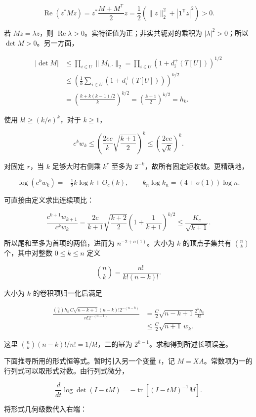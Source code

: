 \documentclass[11pt,a4paper]{article}
\begin{document}
\[\operatorname{Re}(z^*Mz)=z^*\frac{M+M^{\mathsf T}}2z
=\frac12(\|z\|_2^2+|\mathbf1^{\mathsf T}z|^2)>0.\]

若 \(Mz=\lambda z\)，则 \(\operatorname{Re}\lambda>0\)。实特征值为正；非实共轭对的乘积为 \(|\lambda|^2>0\)；所以 \(\det M>0\)。另一方面，

\[\begin{aligned}
|\det M|&\le\prod_{i\in U}\|M_{i,\cdot}\|_2
=\prod_{i\in U}(1+d_i^+(T[U]))^{1/2}\\
&\le\left(\frac1k\sum_{i\in U}(1+d_i^+(T[U]))\right)^{k/2}\\
&=\left(\frac{k+k(k-1)/2}{k}\right)^{k/2}
=\left(\frac{k+1}{2}\right)^{k/2}=h_k.
\end{aligned}\]

使用 \(k!\ge(k/e)^k\)，对于 \(k\ge1\)，

\[c^kw_k\le\left(\frac{2ec}{k}\sqrt{\frac{k+1}{2}}\right)^k
\le\left(\frac{2ec}{\sqrt k}\right)^k.\]

对固定 \(r\)，当 \(k\) 足够大时右侧乘 \(k^r\) 至多为 \(2^{-k}\)，故所有固定矩收敛。更精确地，

\[\log(c^kw_k)=-\tfrac12k\log k+O_c(k),\qquad
k_n\log k_n=(4+o(1))\log n.\]

可直接由定义求出连续项比：

\[\frac{c^{k+1}w_{k+1}}{c^kw_k}
=\frac{2c}{k+1}\sqrt{\frac{k+2}{2}}
\left(1+\frac1{k+1}\right)^{k/2}
\le\frac{K_c}{\sqrt{k+1}}.\]

所以尾和至多为首项的两倍，进而为 \(n^{-2+o(1)}\)。大小为 \(k\) 的顶点子集共有 \(\binom nk\) 个，其中对整数 \(0\le k\le n\) 定义

\[\binom nk=\frac{n!}{k!(n-k)!}.\]

大小为 \(k\) 的卷积项归一化后满足

\[\begin{aligned}
\frac{\binom nk h_k\,C\sqrt{n-k+1}(n-k)!2^{-(n-k)}}{n!2^{-(n-1)}}
&=\frac C2\sqrt{n-k+1}\frac{2^kh_k}{k!}\\
&\le\frac C2\sqrt{n+1}\,w_k.
\end{aligned}\]

这里 \(\binom nk(n-k)!/n!=1/k!\)，二的幂为 \(2^{k-1}\)。求和得到所述长项误差。

下面推导所用的形式恒等式。暂时引入另一个变量 \(t\)，记 \(M=XA\)。常数项为一的行列式可以取形式对数。由行列式微分，

\[\frac{d}{dt}\log\det(I-tM)
=-\operatorname{tr}[(I-tM)^{-1}M].\]

将形式几何级数代入右端：
\end{document}
